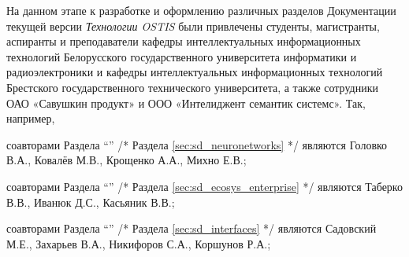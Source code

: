 \begin{SCn}
{На данном этапе к разработке и оформлению различных разделов Документации текущей версии \textit{Технологии OSTIS} были привлечены студенты, магистранты, аспиранты и преподаватели кафедры интеллектуальных информационных технологий Белорусского государственного университета информатики и радиоэлектроники и кафедры интеллектуальных информационных технологий Брестского государственного технического университета, а также сотрудники ОАО «Савушкин продукт» и ООО «Интелиджент семантик системс». Так, например,
\begin{scnitemize}
\item соавторами Раздела ``''{} /* Раздела \ref{sec:sd_neuronetworks} */ являются Головко В.А., Ковалёв М.В., Крощенко А.А., Михно Е.В.;
\item соавторами Раздела ``''{} /* Раздела \ref{sec:sd_ecosys_enterprise} */ являются Таберко В.В., Иванюк Д.С., Касьяник В.В.;
\item соавторами Раздела ``''{}  /* Раздела \ref{sec:sd_interfaces} */ являются Садовский М.Е., Захарьев В.А.,  Никифоров С.А., Коршунов Р.А.;
\end{scnitemize}
}


\scnendstruct

\end{SCn}
